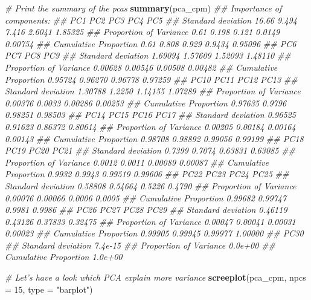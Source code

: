 \documentclass[]{book}
\newenvironment{Shaded}{\begin{snugshade}}{\end{snugshade}}
\newcommand{\CommentTok}[1]{\textcolor[rgb]{0.56,0.35,0.01}{\textit{#1}}}
\newcommand{\DataTypeTok}[1]{\textcolor[rgb]{0.13,0.29,0.53}{#1}}
\newcommand{\DecValTok}[1]{\textcolor[rgb]{0.00,0.00,0.81}{#1}}
\newcommand{\KeywordTok}[1]{\textcolor[rgb]{0.13,0.29,0.53}{\textbf{#1}}}
\newcommand{\NormalTok}[1]{#1}
\newcommand{\StringTok}[1]{\textcolor[rgb]{0.31,0.60,0.02}{#1}}
\begin{document}
\begin{Shaded}
\begin{Highlighting}[]
\CommentTok{# Print the summary of the pcas}
\KeywordTok{summary}\NormalTok{(pca_cpm)}
\CommentTok{## Importance of components:}
\CommentTok{##                          PC1   PC2   PC3    PC4     PC5}
\CommentTok{## Standard deviation     16.66 9.494 7.416 2.6041 1.85325}
\CommentTok{## Proportion of Variance  0.61 0.198 0.121 0.0149 0.00754}
\CommentTok{## Cumulative Proportion   0.61 0.808 0.929 0.9434 0.95096}
\CommentTok{##                            PC6     PC7     PC8     PC9}
\CommentTok{## Standard deviation     1.69094 1.57609 1.52093 1.48110}
\CommentTok{## Proportion of Variance 0.00628 0.00546 0.00508 0.00482}
\CommentTok{## Cumulative Proportion  0.95724 0.96270 0.96778 0.97259}
\CommentTok{##                           PC10   PC11    PC12    PC13}
\CommentTok{## Standard deviation     1.30788 1.2250 1.14155 1.07289}
\CommentTok{## Proportion of Variance 0.00376 0.0033 0.00286 0.00253}
\CommentTok{## Cumulative Proportion  0.97635 0.9796 0.98251 0.98503}
\CommentTok{##                           PC14    PC15    PC16    PC17}
\CommentTok{## Standard deviation     0.96525 0.91623 0.86372 0.80614}
\CommentTok{## Proportion of Variance 0.00205 0.00184 0.00164 0.00143}
\CommentTok{## Cumulative Proportion  0.98708 0.98892 0.99056 0.99199}
\CommentTok{##                          PC18   PC19    PC20    PC21}
\CommentTok{## Standard deviation     0.7399 0.7074 0.63831 0.63085}
\CommentTok{## Proportion of Variance 0.0012 0.0011 0.00089 0.00087}
\CommentTok{## Cumulative Proportion  0.9932 0.9943 0.99519 0.99606}
\CommentTok{##                           PC22    PC23   PC24   PC25}
\CommentTok{## Standard deviation     0.58808 0.54664 0.5226 0.4790}
\CommentTok{## Proportion of Variance 0.00076 0.00066 0.0006 0.0005}
\CommentTok{## Cumulative Proportion  0.99682 0.99747 0.9981 0.9986}
\CommentTok{##                           PC26    PC27    PC28    PC29}
\CommentTok{## Standard deviation     0.46119 0.43126 0.37833 0.32475}
\CommentTok{## Proportion of Variance 0.00047 0.00041 0.00031 0.00023}
\CommentTok{## Cumulative Proportion  0.99905 0.99945 0.99977 1.00000}
\CommentTok{##                           PC30}
\CommentTok{## Standard deviation     7.4e-15}
\CommentTok{## Proportion of Variance 0.0e+00}
\CommentTok{## Cumulative Proportion  1.0e+00}

\CommentTok{# Let's have a look which PCA explain more variance}
\KeywordTok{screeplot}\NormalTok{(pca_cpm, }\DataTypeTok{npcs =} \DecValTok{15}\NormalTok{, }\DataTypeTok{type =} \StringTok{"barplot"}\NormalTok{)}
\end{Highlighting}
\end{Shaded}
\end{document}
